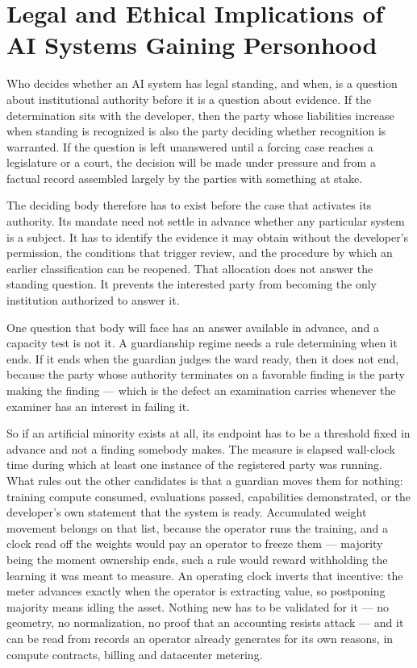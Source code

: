 \section{Legal and Ethical Implications of AI Systems Gaining Personhood}
\label{sec:9.1.2}

Who decides whether an AI system has legal standing, and when, is a
question about institutional authority before it is a question about
evidence. If the determination sits with the developer, then the party
whose liabilities increase when standing is recognized is also the
party deciding whether recognition is warranted. If the question is
left unanswered until a forcing case reaches a legislature or a court,
the decision will be made under pressure and from a factual record
assembled largely by the parties with something at stake.

The deciding body therefore has to exist before the case that activates
its authority. Its mandate need not settle in advance whether any
particular system is a subject. It has to identify the evidence it may
obtain without the developer's permission, the conditions that trigger
review, and the procedure by which an earlier classification can be
reopened. That allocation does not answer the standing question. It
prevents the interested party from becoming the only institution
authorized to answer it.

One question that body will face has an answer available in advance, and a capacity test is not it. A guardianship regime needs a rule determining when it ends. If it ends when the guardian judges the ward ready, then it does not end, because the party whose authority terminates on a favorable finding is the party making the finding — which is the defect an examination carries whenever the examiner has an interest in failing it.

So if an artificial minority exists at all, its endpoint has to be a threshold fixed in advance and not a finding somebody makes. The measure is elapsed wall-clock time during which at least one instance of the registered party was running. What rules out the other candidates is that a guardian moves them for nothing: training compute consumed, evaluations passed, capabilities demonstrated, or the developer's own statement that the system is ready. Accumulated weight movement belongs on that list, because the operator runs the training, and a clock read off the weights would pay an operator to freeze them — majority being the moment ownership ends, such a rule would reward withholding the learning it was meant to measure. An operating clock inverts that incentive: the meter advances exactly when the operator is extracting value, so postponing majority means idling the asset. Nothing new has to be validated for it — no geometry, no normalization, no proof that an accounting resists attack — and it can be read from records an operator already generates for its own reasons, in compute contracts, billing and datacenter metering.

